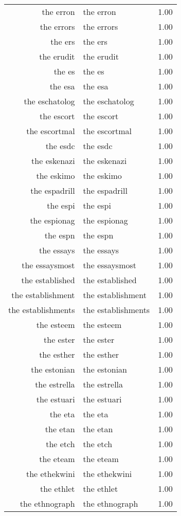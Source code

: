 \begin{table}[ht]
\begin{tabular}{rlr}
  the erron & the erron & 1.00 \\ 
  the errors & the errors & 1.00 \\ 
  the ers & the ers & 1.00 \\ 
  the erudit & the erudit & 1.00 \\ 
  the es & the es & 1.00 \\ 
  the esa & the esa & 1.00 \\ 
  the eschatolog & the eschatolog & 1.00 \\ 
  the escort & the escort & 1.00 \\ 
  the escortmal & the escortmal & 1.00 \\ 
  the esdc & the esdc & 1.00 \\ 
  the eskenazi & the eskenazi & 1.00 \\ 
  the eskimo & the eskimo & 1.00 \\ 
  the espadrill & the espadrill & 1.00 \\ 
  the espi & the espi & 1.00 \\ 
  the espionag & the espionag & 1.00 \\ 
  the espn & the espn & 1.00 \\ 
  the essays & the essays & 1.00 \\ 
  the essaysmost & the essaysmost & 1.00 \\ 
  the established & the established & 1.00 \\ 
  the establishment & the establishment & 1.00 \\ 
  the establishments & the establishments & 1.00 \\ 
  the esteem & the esteem & 1.00 \\ 
  the ester & the ester & 1.00 \\ 
  the esther & the esther & 1.00 \\ 
  the estonian & the estonian & 1.00 \\ 
  the estrella & the estrella & 1.00 \\ 
  the estuari & the estuari & 1.00 \\ 
  the eta & the eta & 1.00 \\ 
  the etan & the etan & 1.00 \\ 
  the etch & the etch & 1.00 \\ 
  the eteam & the eteam & 1.00 \\ 
  the ethekwini & the ethekwini & 1.00 \\ 
  the ethlet & the ethlet & 1.00 \\ 
  the ethnograph & the ethnograph & 1.00 \\ 

\end{tabular}
\end{table}
